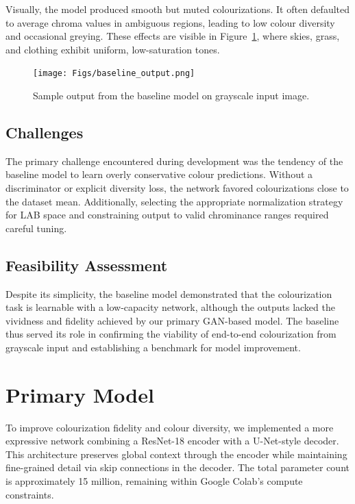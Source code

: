 \documentclass{article} %
\begin{document}
Visually, the model produced smooth but muted colourizations. It often defaulted to average chroma values in ambiguous regions, leading to low colour diversity and occasional greying. These effects are visible in Figure~\ref{fig:baseline_outputs}, where skies, grass, and clothing exhibit uniform, low-saturation tones.

\begin{figure}[htbp]
    \centering
    \texttt{[image: Figs/baseline\_output.png]}
    \caption{Sample output from the baseline model on grayscale input image.}
    \label{fig:baseline_outputs}
\end{figure}

\subsection{Challenges}

The primary challenge encountered during development was the tendency of the baseline model to learn overly conservative colour predictions. Without a discriminator or explicit diversity loss, the network favored colourizations close to the dataset mean. Additionally, selecting the appropriate normalization strategy for LAB space and constraining output to valid chrominance ranges required careful tuning.

\subsection{Feasibility Assessment}

Despite its simplicity, the baseline model demonstrated that the colourization task is learnable with a low-capacity network, although the outputs lacked the vividness and fidelity achieved by our primary GAN-based model. The baseline thus served its role in confirming the viability of end-to-end colourization from grayscale input and establishing a benchmark for model improvement.

\section{Primary Model}

To improve colourization fidelity and colour diversity, we implemented a more expressive network combining a ResNet-18 encoder with a U-Net-style decoder. This architecture preserves global context through the encoder while maintaining fine-grained detail via skip connections in the decoder. The total parameter count is approximately 15 million, remaining within Google Colab's compute constraints.
\end{document}
